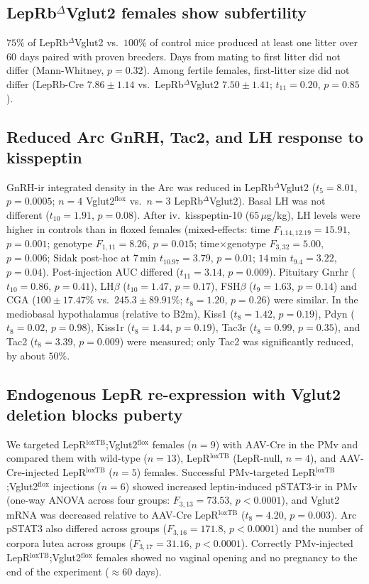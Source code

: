 \documentclass[11pt]{article}
\begin{document}
\subsection{LepRb$^{\Delta}$Vglut2 females show subfertility}
$75\%$ of LepRb$^{\Delta}$Vglut2 vs.\ $100\%$ of control mice produced at least one litter over $60$ days paired with proven breeders. Days from mating to first litter did not differ (Mann-Whitney, $p = 0.32$). Among fertile females, first-litter size did not differ (LepRb-Cre $7.86 \pm 1.14$ vs.\ LepRb$^{\Delta}$Vglut2 $7.50 \pm 1.41$; $t_{11} = 0.20$, $p = 0.85$).

\subsection{Reduced Arc GnRH, Tac2, and LH response to kisspeptin}
GnRH-ir integrated density in the Arc was reduced in LepRb$^{\Delta}$Vglut2 ($t_5 = 8.01$, $p = 0.0005$; $n = 4$ Vglut2$^{\mathrm{flox}}$ vs.\ $n = 3$ LepRb$^{\Delta}$Vglut2). Basal LH was not different ($t_{10} = 1.91$, $p = 0.08$). After iv.\ kisspeptin-10 ($65\,\mu$g/kg), LH levels were higher in controls than in floxed females (mixed-effects: time $F_{1.14,12.19} = 15.91$, $p = 0.001$; genotype $F_{1,11} = 8.26$, $p = 0.015$; time$\times$genotype $F_{3,32} = 5.00$, $p = 0.006$; Sidak post-hoc at $7$\,min $t_{10.97} = 3.79$, $p = 0.01$; $14$\,min $t_{9.4} = 3.22$, $p = 0.04$). Post-injection AUC differed ($t_{11} = 3.14$, $p = 0.009$). Pituitary Gnrhr ($t_{10} = 0.86$, $p = 0.41$), LH$\beta$ ($t_{10} = 1.47$, $p = 0.17$), FSH$\beta$ ($t_9 = 1.63$, $p = 0.14$) and CGA ($100 \pm 17.47\%$ vs.\ $245.3 \pm 89.91\%$; $t_8 = 1.20$, $p = 0.26$) were similar. In the mediobasal hypothalamus (relative to B2m), Kiss1 ($t_8 = 1.42$, $p = 0.19$), Pdyn ($t_8 = 0.02$, $p = 0.98$), Kiss1r ($t_8 = 1.44$, $p = 0.19$), Tac3r ($t_8 = 0.99$, $p = 0.35$), and Tac2 ($t_8 = 3.39$, $p = 0.009$) were measured; only Tac2 was significantly reduced, by about $50\%$.

\subsection{Endogenous LepR re-expression with Vglut2 deletion blocks puberty}
We targeted LepR$^{\mathrm{loxTB}}$;Vglut2$^{\mathrm{flox}}$ females ($n=9$) with AAV-Cre in the PMv and compared them with wild-type ($n=13$), LepR$^{\mathrm{loxTB}}$ (LepR-null, $n=4$), and AAV-Cre-injected LepR$^{\mathrm{loxTB}}$ ($n=5$) females. Successful PMv-targeted LepR$^{\mathrm{loxTB}}$;Vglut2$^{\mathrm{flox}}$ injections ($n=6$) showed increased leptin-induced pSTAT3-ir in PMv (one-way ANOVA across four groups: $F_{3,13} = 73.53$, $p < 0.0001$), and Vglut2 mRNA was decreased relative to AAV-Cre LepR$^{\mathrm{loxTB}}$ ($t_8 = 4.20$, $p = 0.003$). Arc pSTAT3 also differed across groups ($F_{3,16} = 171.8$, $p < 0.0001$) and the number of corpora lutea across groups ($F_{3,17} = 31.16$, $p < 0.0001$). Correctly PMv-injected LepR$^{\mathrm{loxTB}}$;Vglut2$^{\mathrm{flox}}$ females showed no vaginal opening and no pregnancy to the end of the experiment ($\approx 60$ days).
\end{document}
